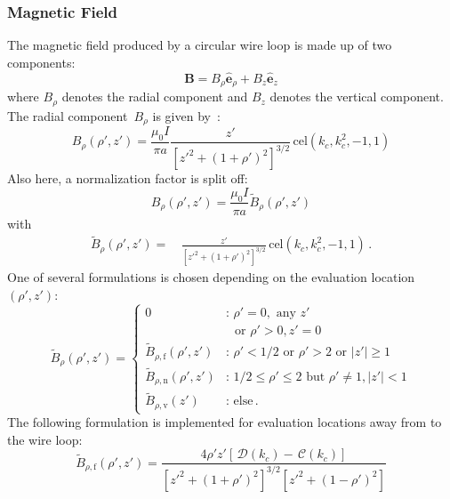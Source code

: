 \subsubsection{Magnetic Field}
The magnetic field produced by a circular wire loop is made up of two components:
\begin{equation}
  \mathbf{B} = B_\rho \hat{\mathbf{e}}_\rho + B_z \hat{\mathbf{e}}_z
\end{equation}
where $B_\rho$ denotes the radial component and $B_z$ denotes the vertical component.
The radial component~$B_\rho$ is given by~\cite{teal}:
\begin{equation}
  B_\rho(\rho', z')
  = \frac{\mu_0 I}{\pi a} \frac{z'}{\left[ z'^2 + (1 + \rho')^2 \right]^{3/2}} \,\mathrm{cel}(k_c, k_c^2, -1, 1)
\end{equation}
Also here, a normalization factor is split off:
\begin{equation}
  B_\rho(\rho', z') = \frac{\mu_0 I}{\pi a} \tilde{B}_\rho(\rho', z')
\end{equation}
with
\begin{align}
  \tilde{B}_\rho(\rho', z')
  =&\, \frac{z'}{\left[ z'^2 + (1 + \rho')^2 \right]^{3/2}} \,\mathrm{cel}(k_c, k_c^2, -1, 1) \, .
\end{align}
One of several formulations is chosen depending on the evaluation location~$(\rho', z')$:
\begin{equation}
  \tilde{B}_\rho(\rho', z')
  = \begin{cases}
      0                                 &:\, \rho' = 0, \textrm{ any } z' \\
                    ~                   &\, ~\textrm{ or } \rho' > 0, z' = 0 \\
      \tilde{B}_{\rho,\mathrm{f}} (\rho', z') &:\, \rho' < 1/2 \textrm{ or } \rho' > 2 \textrm{ or } |z'| \geq 1 \\
      \tilde{B}_{\rho,\mathrm{n}} (\rho', z') &:\, 1/2 \leq \rho' \leq 2 \textrm{ but } \rho' \neq 1, |z'| < 1 \\
      \tilde{B}_{\rho,\mathrm{v}} (z')        &:\, \textrm{else} \, .
    \end{cases}
\end{equation}
The following formulation is implemented for evaluation locations away from to the wire loop:
\begin{equation}
  \tilde{B}_{\rho,\mathrm{f}} (\rho', z')
  = \frac{4 \rho' z' \left[ \,\mathcal{D}(k_c) - \,\mathcal{C}(k_c) \right]}
         {\left[{z'}^2 + (1 + \rho')^2 \right]^{3/2} \left[{z'}^2 + (1 - \rho')^2 \right] } \label{eqn:cwl_B_rho_f}
\end{equation}
